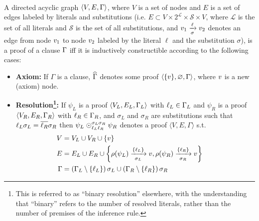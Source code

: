 \begin{definition} 
\label{def:proof} \hfill \\
A directed acyclic graph $\langle V, E, \clause \rangle$, where $V$ is a set of nodes and $E$ is a
set of edges labeled by literals and substitutions (i.e. $E \subset V \times 2^{\mathcal{L}} \times \mathcal{S} \times V$, where $\mathcal{L}$ is the set of all literals and $\mathcal{S}$ is the set of all substitutions, and $\n_1
\xrightarrow[\sigma]{\ell} \n_2$ denotes an edge from node $\n_1$ to node $\n_2$ labeled by the literal $\ell$ and the substitution $\sigma$), is a
proof of a clause $\clause$ iff it is inductively constructible according to the following cases:
%
\begin{itemize}
  \item \textbf{Axiom:} If $\Gamma$ is a clause, $\axiom{\Gamma}$ denotes some proof $\langle \{ \n \}, \varnothing,
    \Gamma \rangle$, where $\n$ is a new (axiom) node.
  \item \textbf{Resolution\footnote{This is referred to as ``binary resolution'' elsewhere, with the understanding that ``binary'' refers to the number of resolved literals, rather than the number of premises of the inference rule.}:} If $\psi_L$ is a proof $\langle V_L, E_L, \clause_L \rangle$ with $\ell_L \in \clause_L$ and
    $\psi_R$ is a proof $\langle V_R, E_R, \clause_R \rangle$ with $\ell_R \in \clause_R$, and 
    $\sigma_L$ and $\sigma_R$ are substitutions such that
    $\ell_L \sigma_L = \dual{\ell_R} \sigma_R$ %
    then
    $\psi_L \res{\ell_L}{\sigma_L}{\ell_R}{\sigma_R} \psi_R$ denotes a proof $\langle V, E, \Gamma \rangle$ s.t.
    \begin{align*}
     \hspace{-0.6cm} V &= V_L \cup V_R \cup \{\n \}    \\
      \hspace{-0.6cm} E &= E_L \cup E_R \cup 
                    \left\{ \raiz{\psi_L} \xrightarrow[\sigma_L]{\{\ell_L\} } \n, 
                            \raiz{\psi_R} \xrightarrow[\sigma_R]{\{\ell_R\} } \n \right\}    \\
    \hspace{-0.6cm}  \Gamma &= \left( \clause_L \setminus \left\{ \ell_L \right\} \right) \sigma_L \cup \left( \clause_R
                    \setminus \left\{ \ell_R \right\} \right) \sigma_R

\end{align*}
\end{itemize}
\end{definition}
